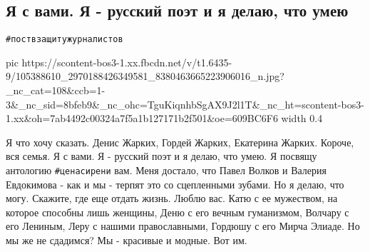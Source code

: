  
 
 
 
 
\subsection{Я с вами. Я - русский поэт и я делаю, что умею}
\label{sec:21_06_2020.fb.bilchenko_evgenia.1.zhurnalisty}
\verb|#поствзащитужурналистов|

\ifcmt
  pic https://scontent-bos3-1.xx.fbcdn.net/v/t1.6435-9/105388610_2970188426349581_8380463665223906016_n.jpg?_nc_cat=108&ccb=1-3&_nc_sid=8bfeb9&_nc_ohc=TguKiqnhbSgAX9J2l1T&_nc_ht=scontent-bos3-1.xx&oh=7ab4492c00324a7f5a1b127171b2f501&oe=609BC6F6
	width 0.4
\fi

Я что хочу сказать. Денис Жарких, Гордей Жарких, Екатерина Жарких. Короче, вся
семья. Я с вами. Я - русский поэт и я делаю, что умею. Я посвящу антологию
\verb|#ценасирени| вам. Меня достало, что Павел Волков и Валерия Евдокимова -
как и мы - терпят это со сцепленными зубами. Но я делаю, что могу. Скажите, где
еще отдать жизнь. Люблю вас. Катю с ее мужеством, на которое способны лишь
женщины, Деню с его вечным гуманизмом, Волчару с его Лениным, Леру с нашими
православными, Гордюшу с его Мирча Элиаде. Но мы же не сдадимся? Мы - красивые
и модные. Вот им.



